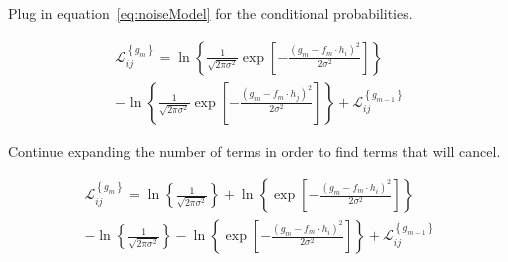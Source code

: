 \noindent Plug in equation~\ref{eq:noiseModel} for the conditional probabilities.

\begin{multline}
    \mathscr{L}_{ij}^{\left\{g_m\right\}}
    =
    \ln{
        \left\{
            \frac
            {
                1
            }
            {
                \sqrt{2\pi \sigma^2}
            }
            \exp{
            \left[
                -
                \frac
                {
                \left( g_m - f_m \cdot {h}_i \right)^2
                }
                {
                2 \sigma^2
                }
            \right]
            }
        \right\}
    }
    \\
    -
    \ln{
        \left\{
            \frac
            {
                1
            }
            {
                \sqrt{2\pi \sigma^2}
            }
            \exp{
            \left[
                -
                \frac
                {
                \left( g_m - f_m \cdot {h}_j \right)^2
                }
                {
                2 \sigma^2
                }
            \right]
            }
        \right\}
    }
    +
    \mathscr{L}_{ij}^{\left\{g_{m-1}\right\}}
\end{multline}

\noindent Continue expanding the number of terms in order to find terms that will cancel.

\begin{multline}
    \mathscr{L}_{ij}^{\left\{g_m\right\}}
    =
    \ln{
        \left\{
            \frac
            {
                1
            }
            {
                \sqrt{2\pi \sigma^2}
            }
        \right\}
    }
    +
    \ln{
    \left\{
            \exp{
            \left[
                -
                \frac
                {
                \left( g_m - f_m \cdot {h}_i \right)^2
                }
                {
                2 \sigma^2
                }
            \right]
            }
        \right\}
    }
    \\
    -
    \ln{
        \left\{
            \frac
            {
                1
            }
            {
                \sqrt{2\pi \sigma^2}
            }
        \right\}
    }
    -
    \ln{
    \left\{
            \exp{
            \left[
                -
                \frac
                {
                \left( g_m - f_m \cdot {h}_i \right)^2
                }
                {
                2 \sigma^2
                }
            \right]
            }
        \right\}
    }
    +
    \mathscr{L}_{ij}^{\left\{g_{m-1}\right\}}
\end{multline}

